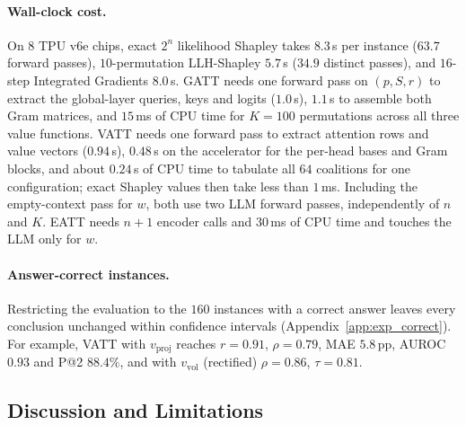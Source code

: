 \paragraph{Wall-clock cost.}
On $8$ TPU v6e chips, exact $2^n$ likelihood Shapley takes $8.3$\,s per instance ($63.7$ forward passes), $10$-permutation LLH-Shapley $5.7$\,s ($34.9$ distinct passes), and $16$-step Integrated Gradients $8.0$\,s. GATT needs one forward pass on $(p, S, r)$ to extract the global-layer queries, keys and logits ($1.0$\,s), $1.1$\,s to assemble both Gram matrices, and $15$\,ms of CPU time for $K = 100$ permutations across all three value functions. VATT needs one forward pass to extract attention rows and value vectors ($0.94$\,s), $0.48$\,s on the accelerator for the per-head bases and Gram blocks, and about $0.24$\,s of CPU time to tabulate all $64$ coalitions for one configuration; exact Shapley values then take less than $1$\,ms. Including the empty-context pass for $w$, both use two LLM forward passes, independently of $n$ and $K$. EATT needs $n + 1$ encoder calls and $30$\,ms of CPU time and touches the LLM only for $w$.

\paragraph{Answer-correct instances.}
Restricting the evaluation to the $160$ instances with a correct answer leaves every conclusion unchanged within confidence intervals (Appendix~\ref{app:exp_correct}). For example, VATT with $v_{\text{proj}}$ reaches $r = 0.91$, $\rho = 0.79$, MAE $5.8$\,pp, AUROC $0.93$ and P@2 $88.4\%$, and with $v_{\text{vol}}$ (rectified) $\rho = 0.86$, $\tau = 0.81$.


\subsection{Discussion and Limitations}
\label{subsec:exp_discussion}

